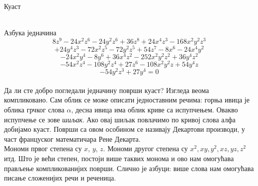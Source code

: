\documentclass[sr]{./../../common/SurferDesc}%
\begin{document}
\footnotesize





\begin{surferPage}
  \begin{surferTitle}Куаст\end{surferTitle} \\
Азбука једначина
  \smallskip
\[8z^9-24x^2z^6-24y^2z^6+36z^8+24x^4z^3-168x^2y^2z^3\]
\[+24y^4z^3-72x^2z^5-72y^2z^5+54z^7-8x^6-24x^4y^2\]
\[-24x^2y^4-8y^6 + 36x^4z^2-252x^2y^2z^2+36y^4z^2\]
\[- 54x^2z^4-108y^2z^4 + 27z^6-108x^2y^2z + 54y^4z\]
\[-54y^2z^3 + 27y^4 = 0\]\\
\vspace{0.3cm}
Да ли сте добро погледали једначину површи куаст? Изгледа веома компликовано. Сам облик се може описати једноставним речима: горња ивица је облика грчког слова $\alpha$, десна ивица има облик криве са испупчењем. Овакво испупчење се зове {\it шиљак}. Ако овај шиљак  повлачимо по кривој слова алфа добијамо куаст. Површи са овом особином се називају Декартови производи, у част француског математичара Рене Декарта.\\
\vspace{0.3cm}
Мономи првог степена су $x$, $y$, $z$. Мономи другог степена су $x^2, xy, y^2, xz, yz, z^2$ итд. Што је већи степен, постоји више таквих монома и ово нам омогућава прављење компликованијих површи. Слично је азбуци: више слова нам омогућава писање сложенијих речи и реченица. 




  \begin{surferText}
     \end{surferText}
\end{surferPage}
\end{document}
